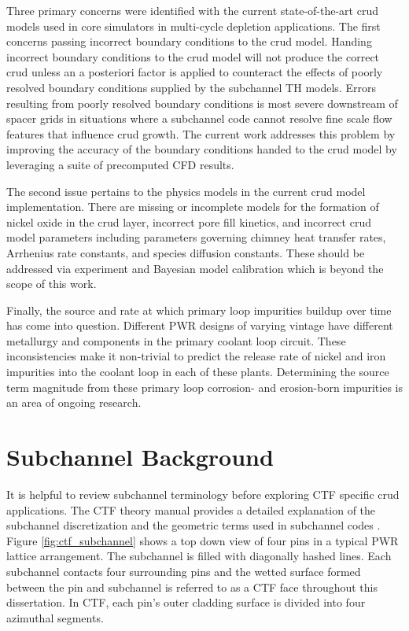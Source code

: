 Three primary concerns were identified with the current state-of-the-art crud models used in core simulators in multi-cycle depletion applications.
The first concerns passing incorrect boundary conditions to the crud model.  Handing incorrect boundary conditions to the crud model will not produce the correct crud unless an a posteriori factor is applied to counteract the effects of poorly resolved boundary conditions supplied by the subchannel TH models.  Errors resulting from poorly resolved boundary conditions is most severe downstream of spacer grids in situations where a subchannel code cannot resolve fine scale flow features that influence crud growth.  The current work addresses this problem by improving the accuracy of the boundary conditions handed to the crud model by leveraging a suite of precomputed CFD results.

The second issue pertains to the physics models in the current crud model implementation.  There are missing or incomplete models for the formation of nickel oxide in the crud layer, incorrect pore fill kinetics, and incorrect crud model parameters including parameters governing chimney heat transfer rates, Arrhenius rate constants, and species diffusion constants. These should be addressed via experiment and Bayesian model calibration which is beyond the scope of this work.

Finally, the source and rate at which primary loop impurities buildup over time has come into question.  Different PWR designs of varying vintage have different metallurgy and components in the primary coolant loop circuit.  These inconsistencies make it non-trivial to predict the release rate of nickel and iron impurities into the coolant loop in each of these plants.  Determining the source term magnitude from these primary loop corrosion- and erosion-born impurities is an area of ongoing research.


\section{Subchannel Background}

It is helpful to review subchannel terminology before exploring CTF specific crud applications.  The CTF theory manual provides a detailed explanation of the subchannel discretization and the geometric terms used in subchannel codes \cite{salko12}.  Figure \ref{fig:ctf_subchannel} shows a top down view of four pins in a typical PWR lattice arrangement.  The subchannel is filled with diagonally hashed lines.  Each subchannel contacts four surrounding pins and the wetted surface formed between the pin and subchannel is referred to as a CTF face throughout this dissertation.  In CTF, each pin's outer cladding surface is divided into four azimuthal segments.

